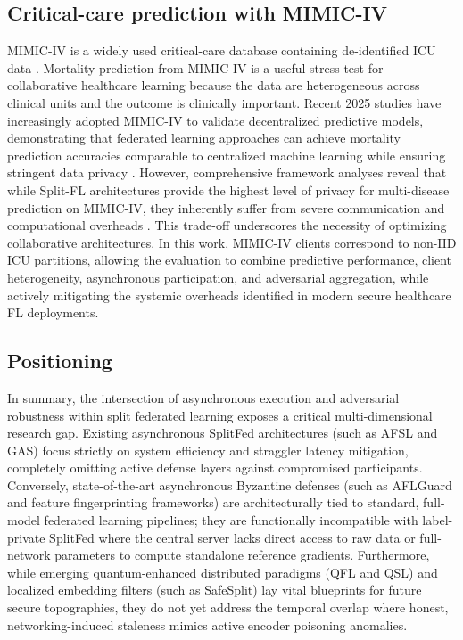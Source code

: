 \documentclass[pdflatex,sn-mathphys-num]{sn-jnl}
\begin{document}
\subsection{Critical-care prediction with MIMIC-IV}
MIMIC-IV is a widely used critical-care database containing de-identified ICU data \cite{johnson2023mimic}. Mortality prediction from MIMIC-IV is a useful stress test for collaborative healthcare learning because the data are heterogeneous across clinical units and the outcome is clinically important. Recent 2025 studies have increasingly adopted MIMIC-IV to validate decentralized predictive models, demonstrating that federated learning approaches can achieve mortality prediction accuracies comparable to centralized machine learning while ensuring stringent data privacy \cite{healthinf25}. However, comprehensive framework analyses reveal that while Split-FL architectures provide the highest level of privacy for multi-disease prediction on MIMIC-IV, they inherently suffer from severe communication and computational overheads \cite{cryptenfl2025}. This trade-off underscores the necessity of optimizing collaborative architectures. In this work, MIMIC-IV clients correspond to non-IID ICU partitions, allowing the evaluation to combine predictive performance, client heterogeneity, asynchronous participation, and adversarial aggregation, while actively mitigating the systemic overheads identified in modern secure healthcare FL deployments.

\subsection{Positioning}

In summary, the intersection of asynchronous execution and adversarial robustness within split federated learning exposes a critical multi-dimensional research gap. Existing asynchronous SplitFed architectures (such as AFSL and GAS) focus strictly on system efficiency and straggler latency mitigation, completely omitting active defense layers against compromised participants. Conversely, state-of-the-art asynchronous Byzantine defenses (such as AFLGuard and feature fingerprinting frameworks) are architecturally tied to standard, full-model federated learning pipelines; they are functionally incompatible with label-private SplitFed where the central server lacks direct access to raw data or full-network parameters to compute standalone reference gradients. Furthermore, while emerging quantum-enhanced distributed paradigms (QFL and QSL) and localized embedding filters (such as SafeSplit) lay vital blueprints for future secure topographies, they do not yet address the temporal overlap where honest, networking-induced staleness mimics active encoder poisoning anomalies. 
\end{document}
